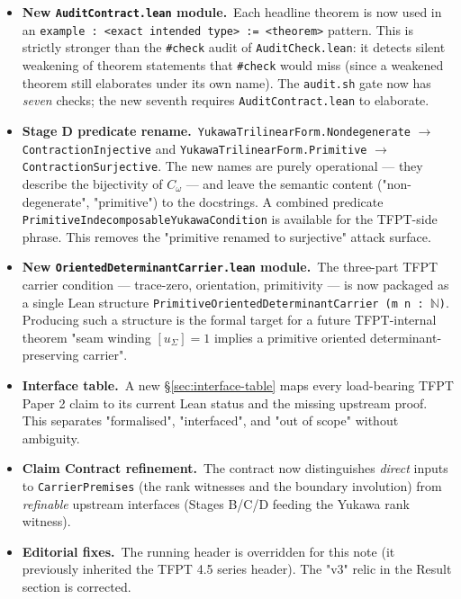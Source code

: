 \documentclass[11pt,a4paper]{article}
\begin{document}
\begin{itemize}[leftmargin=1.6em, itemsep=2pt]
\item \textbf{New \texttt{AuditContract.lean} module.}\ Each
    headline theorem is now used in an
    \texttt{example : <exact intended type> := <theorem>}
    pattern. This is strictly stronger than the \texttt{\#check}
    audit of \texttt{AuditCheck.lean}: it detects silent
    weakening of theorem statements that \texttt{\#check} would
    miss (since a weakened theorem still elaborates under its
    own name). The \texttt{audit.sh} gate now has \emph{seven}
    checks; the new seventh requires
    \texttt{AuditContract.lean} to elaborate.

\item \textbf{Stage D predicate rename.}\
    \texttt{YukawaTrilinearForm.Nondegenerate} $\to$
    \texttt{ContractionInjective} and
    \texttt{YukawaTrilinearForm.Primitive} $\to$
    \texttt{ContractionSurjective}. The new names are purely
    operational --- they describe the bijectivity of
    $C_\omega$ --- and leave the semantic content
    ("non-degenerate", "primitive") to the docstrings. A
    combined predicate
    \texttt{PrimitiveIndecomposableYukawaCondition} is
    available for the TFPT-side phrase. This removes the
    "primitive renamed to surjective" attack surface.

\item \textbf{New
    \texttt{OrientedDeterminantCarrier.lean} module.}\
    The three-part TFPT carrier condition --- trace-zero,
    orientation, primitivity --- is now packaged as a single
    Lean structure
    \texttt{PrimitiveOrientedDeterminantCarrier (m n : \(\mathbb N\))}.
    Producing such a structure is the formal target for
    a future TFPT-internal theorem
    "seam winding $[u_\Sigma] = 1$ implies a primitive oriented
    determinant-preserving carrier".

\item \textbf{Interface table.}\ A new
    \S\ref{sec:interface-table} maps every load-bearing TFPT
    Paper 2 claim to its current Lean status and the missing
    upstream proof. This separates "formalised", "interfaced",
    and "out of scope" without ambiguity.

\item \textbf{Claim Contract refinement.}\ The contract now
    distinguishes \emph{direct} inputs to
    \texttt{CarrierPremises} (the rank witnesses and the
    boundary involution) from \emph{refinable} upstream
    interfaces (Stages B/C/D feeding the Yukawa rank witness).

\item \textbf{Editorial fixes.}\ The running header is
    overridden for this note (it previously inherited the
    TFPT 4.5 series header). The "v3" relic in the Result
    section is corrected.
\end{itemize}
\end{document}
